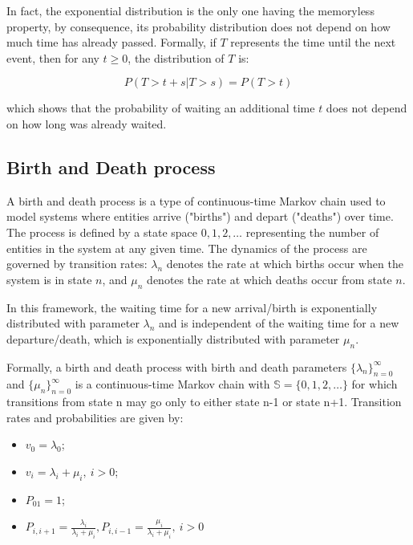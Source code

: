\documentclass{report}
\begin{document}
In fact, the exponential distribution is the only one having the memoryless property, by consequence, its probability distribution does not depend on how much time has already passed. Formally, if $T$ represents the time until the next event, then for any $t \geq 0$, the distribution of $T$ is:

\begin{equation}
	P(T > t + s | T > s) = P(T > t)
\end{equation}

which shows that the probability of waiting an additional time $t$ does not depend on how long was already waited. 

\subsection{Birth and Death process}

A birth and death process is a type of continuous-time Markov chain used to model systems where entities arrive ("births") and depart ("deaths") over time. The process is defined by a state space ${0, 1, 2, \ldots}$ representing the number of entities in the system at any given time. The dynamics of the process are governed by transition rates: $\lambda_n$ denotes the rate at which births occur when the system is in state $n$, and $\mu_n$ denotes the rate at which deaths occur from state $n$.

In this framework, the waiting time for a new arrival/birth is
exponentially distributed with parameter $\lambda_n$ and is independent of the waiting time for a new departure/death, which is exponentially distributed with parameter $\mu_n$.

Formally, a birth and death process with birth and death parameters $\{\lambda_n\}^{\infty}_{n=0}$ and $\{\mu_n\}^{\infty}_{n=0}$ is a continuous-time Markov chain with $\mathbb{S} = \{0,1,2, \ldots\}$ for which transitions from state n may go only to either state n-1 or state n+1. Transition rates and probabilities are given by:

\begin{itemize}
	\item $v_0 = \lambda_0$;
	\item $v_i = \lambda_i + \mu_i, \ i>0$;
	\item $P_{01} = 1$;
	\item $P_{i,i+1}=\frac{\lambda_i}{\lambda_i + \mu_i}, P_{i, i-1} = \frac{\mu_i}{\lambda_i + \mu_i}, \ i>0$
\end{itemize}
\end{document}
